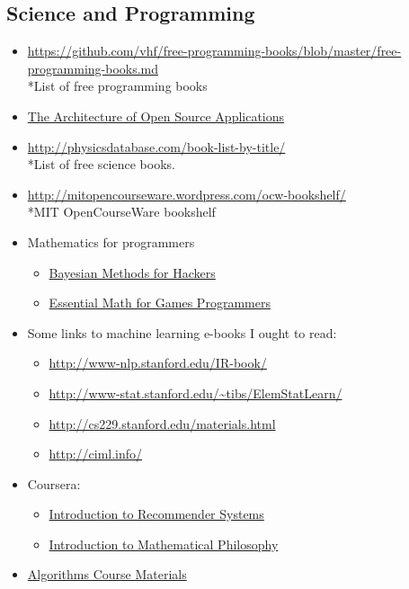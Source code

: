 \documentclass{article}
\begin{document}
\subsection{Science and Programming}
\begin{itemize}
      \item \url{https://github.com/vhf/free-programming-books/blob/master/free-programming-books.md}
      \\*List of free programming books
      \item \href{http://aosabook.org/en/index.html}{The Architecture of Open Source Applications}
       \item \url{http://physicsdatabase.com/book-list-by-title/}
       \\*List of free science books.
       \item \url{http://mitopencourseware.wordpress.com/ocw-bookshelf/}
       \\*MIT OpenCourseWare bookshelf
      \item Mathematics for programmers
      \begin{itemize}
            \item \href{http://camdavidsonpilon.github.io/Probabilistic-Programming-and-Bayesian-Methods-for-Hackers/}{Bayesian Methods for Hackers}
            \item \href{http://www.essentialmath.com/tutorial.htm}{Essential Math for Games Programmers}
      \end{itemize}
      \item Some links to machine learning e-books I ought to read:
      \begin{itemize}
            \item \url{http://www-nlp.stanford.edu/IR-book/}
            \item \url{http://www-stat.stanford.edu/~tibs/ElemStatLearn/}
            \item \url{http://cs229.stanford.edu/materials.html}
            \item \url{http://ciml.info/}
      \end{itemize}
      \item Coursera:
      \begin{itemize}
            \item \href{https://www.coursera.org/course/recsys}{Introduction to Recommender Systems}
            \item \href{https://www.coursera.org/course/mathphil}{Introduction to Mathematical Philosophy}
      \end{itemize}
      \item \href{http://www.cs.uiuc.edu/~jeffe/teaching/algorithms/}{Algorithms Course Materials}
\end{itemize}
%
%
\end{document}
